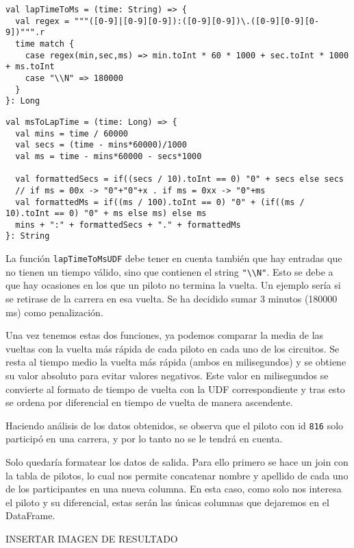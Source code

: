 \documentclass[12pt,twoside,titlepage]{report}
\begin{document}
\begin{lstlisting}
val lapTimeToMs = (time: String) => {
  val regex = """([0-9]|[0-9][0-9]):([0-9][0-9])\.([0-9][0-9][0-9])""".r
  time match {
    case regex(min,sec,ms) => min.toInt * 60 * 1000 + sec.toInt * 1000 + ms.toInt
    case "\\N" => 180000
  }  
}: Long
  \end{lstlisting}

\begin{lstlisting}
val msToLapTime = (time: Long) => {
  val mins = time / 60000
  val secs = (time - mins*60000)/1000
  val ms = time - mins*60000 - secs*1000
    
  val formattedSecs = if((secs / 10).toInt == 0) "0" + secs else secs
  // if ms = 00x -> "0"+"0"+x . if ms = 0xx -> "0"+ms
  val formattedMs = if((ms / 100).toInt == 0) "0" + (if((ms / 10).toInt == 0) "0" + ms else ms) else ms
  mins + ":" + formattedSecs + "." + formattedMs    
}: String
\end{lstlisting}

La función \texttt{lapTimeToMsUDF} debe tener en cuenta también que hay entradas que no tienen un tiempo válido, sino que contienen el string \texttt{"\textbackslash\textbackslash N"}. Esto se debe a que hay ocasiones en los que un piloto no termina la vuelta. Un ejemplo sería si se retirase de la carrera en esa vuelta. Se ha decidido sumar 3 minutos (180000 ms) como penalización.

Una vez tenemos estas dos funciones, ya podemos comparar la media de las vueltas con la vuelta más rápida de cada piloto en cada uno de los circuitos. Se resta al tiempo medio la vuelta más rápida (ambos en milisegundos) y se obtiene su valor absoluto para evitar valores negativos. Este valor en milisegundos se convierte al formato de tiempo de vuelta con la UDF correspondiente y tras esto se ordena por diferencial en tiempo de vuelta de manera ascendente.

Haciendo análisis de los datos obtenidos, se observa que el piloto con id \texttt{816} solo participó en una carrera, y por lo tanto no se le tendrá en cuenta.

Solo quedaría formatear los datos de salida. Para ello primero se hace un join con la tabla de pilotos, lo cual nos permite concatenar nombre y apellido de cada uno de los participantes en una nueva columna. En esta caso, como solo nos interesa el piloto y su diferencial, estas serán las únicas columnas que dejaremos en el DataFrame.

INSERTAR IMAGEN DE RESULTADO 
\end{document}
